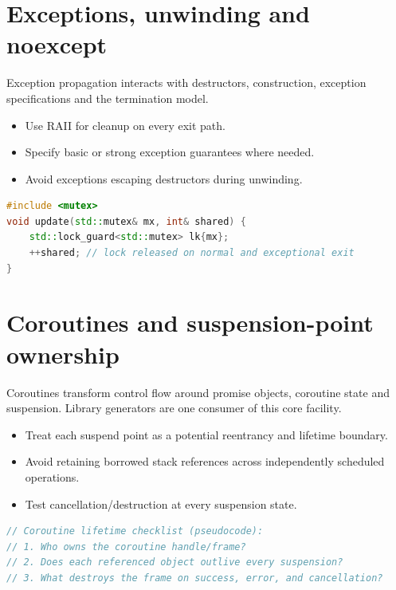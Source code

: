 \documentclass[11pt]{article}
\begin{document}
\section{Exceptions, unwinding and noexcept}
Exception propagation interacts with destructors, construction, exception specifications and the termination model.

\begin{itemize}[leftmargin=*,itemsep=1pt,topsep=3pt]
\item Use RAII for cleanup on every exit path.
\item Specify basic or strong exception guarantees where needed.
\item Avoid exceptions escaping destructors during unwinding.
\end{itemize}
\begin{lstlisting}[language=C++]
#include <mutex>
void update(std::mutex& mx, int& shared) {
    std::lock_guard<std::mutex> lk{mx};
    ++shared; // lock released on normal and exceptional exit
}
\end{lstlisting}
\section{Coroutines and suspension-point ownership}
Coroutines transform control flow around promise objects, coroutine state and suspension. Library generators are one consumer of this core facility.

\begin{itemize}[leftmargin=*,itemsep=1pt,topsep=3pt]
\item Treat each suspend point as a potential reentrancy and lifetime boundary.
\item Avoid retaining borrowed stack references across independently scheduled operations.
\item Test cancellation/destruction at every suspension state.
\end{itemize}
\begin{lstlisting}[language=C++]
// Coroutine lifetime checklist (pseudocode):
// 1. Who owns the coroutine handle/frame?
// 2. Does each referenced object outlive every suspension?
// 3. What destroys the frame on success, error, and cancellation?
\end{lstlisting}
\end{document}
